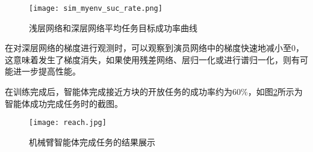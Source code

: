         \begin{figure}[htpb]
        \centering
        \texttt{[image: sim\_myenv\_suc\_rate.png]}
        \caption{浅层网络和深层网络平均任务目标成功率曲线}
            \label{simsuc_rate}
        \end{figure}
在对深层网络的梯度进行观测时，可以观察到演员网络中的梯度快速地减小至0，这意味着发生了梯度消失，如果使用残差网络、层归一化或进行谱归一化，则有可能进一步提高性能。

在训练完成后，智能体完成接近方块的开放任务的成功率约为60\%，如图\ref{reach}所示为智能体成功完成任务时的截图。

        \begin{figure}[htpb]
        \centering
        \texttt{[image: reach.jpg]}
        \caption{机械臂智能体完成任务的结果展示}
            \label{reach}
        \end{figure}
